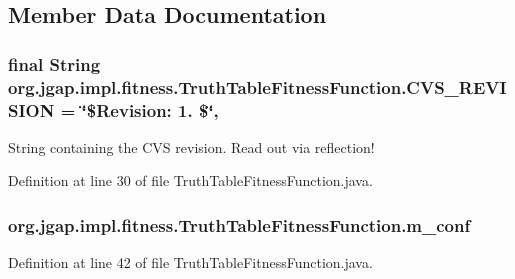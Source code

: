 \subsection{Member Data Documentation}
\hypertarget{classorg_1_1jgap_1_1impl_1_1fitness_1_1_truth_table_fitness_function_ab173d16572fa3cb076091b2a524d1e61}{
\subsubsection[{C\-V\-S\-\_\-\-R\-E\-V\-I\-S\-I\-O\-N}]{\setlength{\rightskip}{0pt plus 5cm}final String org.\-jgap.\-impl.\-fitness.\-Truth\-Table\-Fitness\-Function.\-C\-V\-S\-\_\-\-R\-E\-V\-I\-S\-I\-O\-N = \char`\"{}\$Revision\-: 1. \$\char`\"{}\hspace{0.3cm}{\ttfamily [static]}, {\ttfamily [private]}}}\label{classorg_1_1jgap_1_1impl_1_1fitness_1_1_truth_table_fitness_function_ab173d16572fa3cb076091b2a524d1e61}
String containing the C\-V\-S revision. Read out via reflection! 

Definition at line 30 of file Truth\-Table\-Fitness\-Function.\-java.

\hypertarget{classorg_1_1jgap_1_1impl_1_1fitness_1_1_truth_table_fitness_function_a9b2a529b966eee30948c09fa02a9faef}{
\subsubsection[{m\-\_\-conf}]{ org.\-jgap.\-impl.\-fitness.\-Truth\-Table\-Fitness\-Function.\-m\-\_\-conf\hspace{0.3cm}{\ttfamily [private]}}}\label{classorg_1_1jgap_1_1impl_1_1fitness_1_1_truth_table_fitness_function_a9b2a529b966eee30948c09fa02a9faef}


Definition at line 42 of file Truth\-Table\-Fitness\-Function.\-java.



